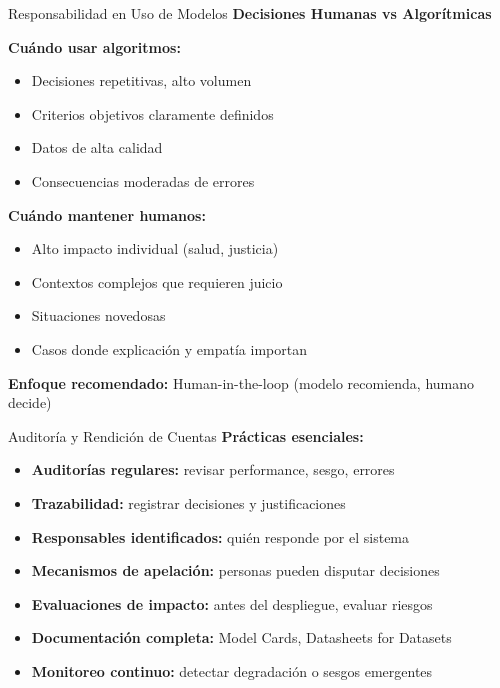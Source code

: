 \documentclass[aspectratio=169]{beamer}
\begin{document}
\begin{frame}{Responsabilidad en Uso de Modelos}
\textbf{Decisiones Humanas vs Algorítmicas}

\vspace{0.3cm}

\textbf{Cuándo usar algoritmos:}
\begin{itemize}
\item Decisiones repetitivas, alto volumen
\item Criterios objetivos claramente definidos
\item Datos de alta calidad
\item Consecuencias moderadas de errores
\end{itemize}

\vspace{0.3cm}

\textbf{Cuándo mantener humanos:}
\begin{itemize}
\item Alto impacto individual (salud, justicia)
\item Contextos complejos que requieren juicio
\item Situaciones novedosas
\item Casos donde explicación y empatía importan
\end{itemize}

\vspace{0.3cm}

\textbf{Enfoque recomendado:} Human-in-the-loop (modelo recomienda, humano decide)
\end{frame}

\begin{frame}{Auditoría y Rendición de Cuentas}
\textbf{Prácticas esenciales:}

\begin{itemize}
\item \textbf{Auditorías regulares:} revisar performance, sesgo, errores

\item \textbf{Trazabilidad:} registrar decisiones y justificaciones

\item \textbf{Responsables identificados:} quién responde por el sistema

\item \textbf{Mecanismos de apelación:} personas pueden disputar decisiones

\item \textbf{Evaluaciones de impacto:} antes del despliegue, evaluar riesgos

\item \textbf{Documentación completa:} Model Cards, Datasheets for Datasets

\item \textbf{Monitoreo continuo:} detectar degradación o sesgos emergentes
\end{itemize}
\end{frame}
\end{document}
